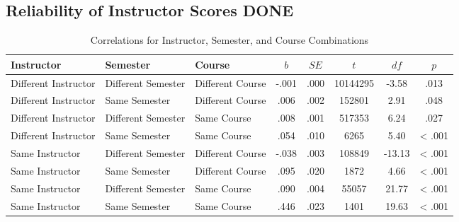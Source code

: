 \documentclass[man]{apa6}
\theoremstyle{definition}
\theoremstyle{definition}
\theoremstyle{definition}
\theoremstyle{remark}
\begin{document}
\hypertarget{reliability-of-instructor-scores-done}{%
\subsection{Reliability of Instructor Scores
DONE}\label{reliability-of-instructor-scores-done}}

\begin{table}[tbp]
\begin{center}
\begin{threeparttable}
\caption{\label{tab:rel-table}Correlations for Instructor, Semester, and Course Combinations}
\small{
\begin{tabular}{lllccccc}
\toprule
Instructor & Semester & Course & $b$ & $SE$ & $t$ & $df$ & $p$\\
\midrule
Different Instructor & Different Semester & Different Course & -.001 & .000 & 10144295 & -3.58 & .013\\
Different Instructor & Same Semester & Different Course & .006 & .002 & 152801 & 2.91 & .048\\
Different Instructor & Different Semester & Same Course & .008 & .001 & 517353 & 6.24 & .027\\
Different Instructor & Same Semester & Same Course & .054 & .010 & 6265 & 5.40 & < .001\\
Same Instructor & Different Semester & Different Course & -.038 & .003 & 108849 & -13.13 & < .001\\
Same Instructor & Same Semester & Different Course & .095 & .020 & 1872 & 4.66 & < .001\\
Same Instructor & Different Semester & Same Course & .090 & .004 & 55057 & 21.77 & < .001\\
Same Instructor & Same Semester & Same Course & .446 & .023 & 1401 & 19.63 & < .001\\
\bottomrule
\end{tabular}
}
\end{threeparttable}
\end{center}
\end{table}
\end{document}
